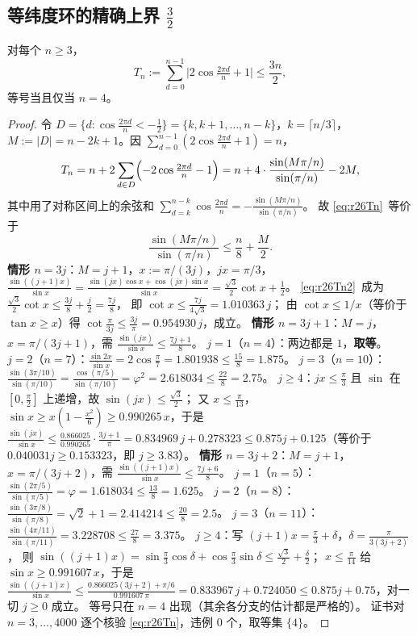 \subsection{等纬度环的精确上界 $\frac32$}\label{sec:r26:ring}

\begin{lemma}[余弦绝对值的均值界]\label{lem:r26Tn}
对每个 $n\ge3$，
\begin{equation}\label{eq:r26Tn}
T_n:=\sum_{d=0}^{n-1}\bigl|2\cos\tfrac{2\pi d}n+1\bigr|\le\frac{3n}2 ,
\end{equation}
等号当且仅当 $n=4$。
\end{lemma}

\begin{proof}
令 $D=\{d:\cos\frac{2\pi d}n<-\frac12\}=\{k,k+1,\dots,n-k\}$，$k=\lceil n/3\rceil$，
$M:=|D|=n-2k+1$。因 $\sum_{d=0}^{n-1}(2\cos\frac{2\pi d}n+1)=n$，
\[
T_n=n+2\sum_{d\in D}\Bigl(-2\cos\tfrac{2\pi d}n-1\Bigr)
=n+4\cdot\frac{\sin(M\pi/n)}{\sin(\pi/n)}-2M ,
\]
其中用了对称区间上的余弦和
$\sum_{d=k}^{n-k}\cos\frac{2\pi d}n=-\frac{\sin(M\pi/n)}{\sin(\pi/n)}$。
故 \eqref{eq:r26Tn}~等价于
\begin{equation}\label{eq:r26Tn2}
\frac{\sin(M\pi/n)}{\sin(\pi/n)}\le\frac n8+\frac M2 .
\end{equation}
\textbf{情形 $n=3j$}：$M=j+1$，$x:=\pi/(3j)$，$jx=\pi/3$，
$\frac{\sin((j+1)x)}{\sin x}=\frac{\sin(jx)\cos x+\cos(jx)\sin x}{\sin x}
=\frac{\sqrt3}2\cot x+\frac12$。
\eqref{eq:r26Tn2}~成为 $\frac{\sqrt3}2\cot x\le\frac{3j}8+\frac j2=\frac{7j}8$，
即 $\cot x\le\frac{7j}{4\sqrt3}=1.010363\,j$；
由 $\cot x\le1/x$（等价于 $\tan x\ge x$）得 $\cot\frac\pi{3j}\le\frac{3j}\pi=0.954930\,j$，成立。
\textbf{情形 $n=3j+1$}：$M=j$，$x=\pi/(3j+1)$，需 $\frac{\sin(jx)}{\sin x}\le\frac{7j+1}8$。
$j=1$（$n=4$）：两边都是 $1$，\textbf{取等}。
$j=2$（$n=7$）：$\frac{\sin2x}{\sin x}=2\cos\frac\pi7=1.801938\le\frac{15}8=1.875$。
$j=3$（$n=10$）：$\frac{\sin(3\pi/10)}{\sin(\pi/10)}=\frac{\cos(\pi/5)}{\sin(\pi/10)}=\varphi^2=2.618034\le\frac{22}8=2.75$。
$j\ge4$：$jx\le\frac\pi3$ 且 $\sin$ 在 $[0,\frac\pi2]$ 上递增，故 $\sin(jx)\le\frac{\sqrt3}2$；
又 $x\le\frac\pi{13}$，$\sin x\ge x(1-\frac{x^2}6)\ge0.990265\,x$，于是
$\frac{\sin(jx)}{\sin x}\le\frac{0.866025}{0.990265}\cdot\frac{3j+1}\pi=0.834969\,j+0.278323
\le0.875j+0.125$（等价于 $0.040031j\ge0.153323$，即 $j\ge3.83$）。
\textbf{情形 $n=3j+2$}：$M=j+1$，$x=\pi/(3j+2)$，需 $\frac{\sin((j+1)x)}{\sin x}\le\frac{7j+6}8$。
$j=1$（$n=5$）：$\frac{\sin(2\pi/5)}{\sin(\pi/5)}=\varphi=1.618034\le\frac{13}8=1.625$。
$j=2$（$n=8$）：$\frac{\sin(3\pi/8)}{\sin(\pi/8)}=\sqrt2+1=2.414214\le\frac{20}8=2.5$。
$j=3$（$n=11$）：$\frac{\sin(4\pi/11)}{\sin(\pi/11)}=3.228708\le\frac{27}8=3.375$。
$j\ge4$：写 $(j+1)x=\frac\pi3+\delta$，$\delta=\frac\pi{3(3j+2)}$，
则 $\sin((j+1)x)=\sin\frac\pi3\cos\delta+\cos\frac\pi3\sin\delta\le\frac{\sqrt3}2+\frac\delta2$；
$x\le\frac\pi{14}$ 给 $\sin x\ge0.991607\,x$，于是
$\frac{\sin((j+1)x)}{\sin x}\le\frac{0.866025(3j+2)+\pi/6}{0.991607\,\pi}
=0.833967\,j+0.724050\le0.875j+0.75$，对一切 $j\ge0$ 成立。
等号只在 $n=4$ 出现（其余各分支的估计都是严格的）。
证书对 $n=3,\dots,4000$ 逐个核验 \eqref{eq:r26Tn}，违例 $0$ 个，取等集 $\{4\}$。
\end{proof}

